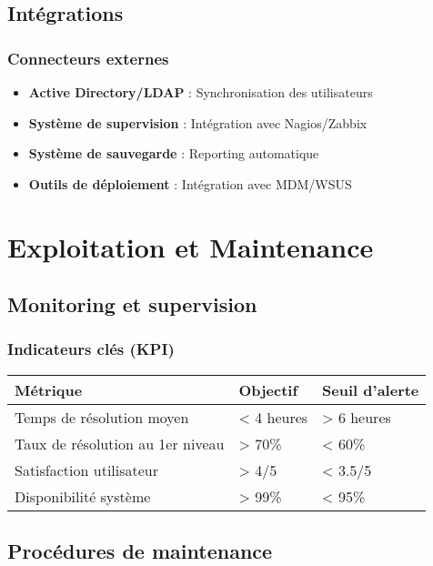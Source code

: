 \documentclass[12pt,a4paper]{article}
\begin{document}
\subsection{Intégrations}

\subsubsection{Connecteurs externes}
\begin{itemize}
    \item \textbf{Active Directory/LDAP} : Synchronisation des utilisateurs
    \item \textbf{Système de supervision} : Intégration avec Nagios/Zabbix
    \item \textbf{Système de sauvegarde} : Reporting automatique
    \item \textbf{Outils de déploiement} : Intégration avec MDM/WSUS
\end{itemize}

\section{Exploitation et Maintenance}

\subsection{Monitoring et supervision}

\subsubsection{Indicateurs clés (KPI)}
\begin{center}
\begin{tabular}{|l|l|l|}
\hline
\textbf{Métrique} & \textbf{Objectif} & \textbf{Seuil d'alerte} \\
\hline
Temps de résolution moyen & < 4 heures & > 6 heures \\
Taux de résolution au 1er niveau & > 70\% & < 60\% \\
Satisfaction utilisateur & > 4/5 & < 3.5/5 \\
Disponibilité système & > 99\% & < 95\% \\
\hline
\end{tabular}
\end{center}

\subsection{Procédures de maintenance}
\end{document}
